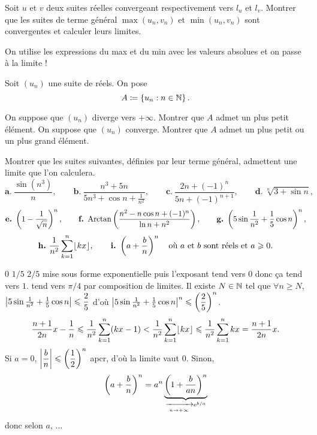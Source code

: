 \documentclass{magnolia}
\begin{document}





Soit $u$ et $v$ deux suites réelles convergeant respectivement vers $l_u$ et
$l_v$. Montrer que les suites de terme général $\max(u_n,v_n)$ et
$\min(u_n,v_n)$ sont convergentes et calculer leurs limites.
\begin{sol}
On utilise les expressions du max et du min avec les valeurs absolues et on passe à la limite !
\end{sol}

Soit $(u_n)$ une suite de réels. On pose
\[A\coloneqq\left\{u_n : n\in\mathbb{N}\right\}.\]
\begin{questions}
\question On suppose que $(u_n)$ diverge vers $+\infty$. Montrer que $A$ admet un plus petit
  élément.
\question On suppose que $(u_n)$ converge. Montrer que $A$ admet un plus petit ou un plus grand  élément.
\end{questions}

Montrer que les suites suivantes, définies par leur terme général, admettent une
limite que l'on calculera.
\[\textbf{a.}\ \frac{\sin (n^3)}{n}, \qquad \textbf{b.}\ \frac{n^3+5n}{5n^3+\cos n+\frac{1}{n^2}}, \qquad
\textbf{c.}\ \frac{2n+(-1)^n}{5n+(-1)^{n+1}}, \qquad \textbf{d.}\ \sqrt[n]{3+\sin n},\]
\[\textbf{e.}\ \p{1-\frac{1}{\sqrt{n}}}^n,\qquad \textbf{f.}\ \arctan\left(\frac{n^2-n\cos n +(-1)^n}{\ln n + n^2}\right), \qquad
\textbf{g.}\ \left(5\sin\frac{1}{n^2}+\frac{1}{5}\cos n\right)^n,\]
\[\textbf{h.}\ \frac{1}{n^2} \sum_{k=1}^{n} \ent{kx},
  \qquad \textbf{i.}\ \left(a+\frac{b}{n}\right)^n \quad
  \text{o\`u $a$ et $b$ sont réels et $a\geq 0$}.\]
\begin{sol}
\begin{questions}
\question $0$
\question $1/5$
\question $2/5$
\question mise sous forme exponentielle puis l'exposant tend vers $0$ donc ça tend vers $1$.
\question tend vers $\pi/4$ par composition de limites.
\question Il existe $N\in \mathbb{N}$ tel que $\forall n\geq N$, $\left|5\sin\frac{1}{n^2}+\frac{1}{5}\cos n\right|\leqslant \dfrac{2}{5}$ d'où $\left|5\sin\frac{1}{n^2}+\frac{1}{5}\cos n\right|^n\leqslant \left(\dfrac{2}{5}\right)^n$.
\question $$\frac{n+1}{2n}x-\frac{1}{n}\leq \frac{1}{n^2} \sum_{k=1}^{n} (kx-1)<\frac{1}{n^2} \sum_{k=1}^{n} \ent{kx}\leq \frac{1}{n^2} \sum_{k=1}^{n} kx=\frac{n+1}{2n}x.$$
\question Si $a=0$, $\displaystyle\left|\frac{b}{n}\right|\leqslant \left(\frac{1}{2}\right)^n$ apcr, d'où la limite vaut $0$. Sinon, $$\left(a+\frac{b}{n}\right)^n=a^n\underbrace{\left(1+\frac{b}{an}\right)^n}_{\xrightarrow[n\rightarrow +\infty]{}{{\rm e}^{b/a}}}$$ donc selon $a$, ...
\end{questions}
\end{sol}
\end{document}

